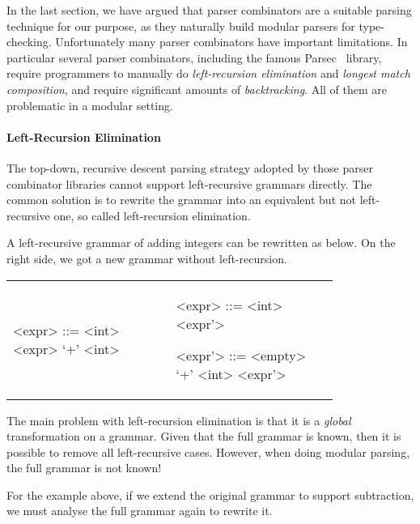 
In the last section, we have argued that parser combinators are a suitable parsing technique for
our purpose, as they naturally build modular parsers for type-checking.
Unfortunately many parser combinators have important limitations.
In particular several parser combinators,
including the famous Parsec~\cite{Leijen2001} library, require
programmers to manually do \textit{left-recursion elimination} and \textit{longest match composition}, and
require significant amounts of \textit{backtracking}. All of them are
problematic in a modular setting.



\paragraph{Left-Recursion Elimination} The top-down, recursive descent parsing strategy adopted by those parser combinator libraries cannot support left-recursive grammars directly. The common solution is to rewrite the grammar into an equivalent but not left-recursive one, so called left-recursion elimination.

A left-recursive grammar of adding integers can be rewritten as below. On the right side, we got a new grammar without left-recursion.

\begin{tabular}{m{0.4\linewidth}m{0.4\linewidth}}
\setlength{\grammarindent}{5em}
\begin{grammar}
<expr> ::= <int> \alt <expr> `+' <int>
\end{grammar}
&
\setlength{\grammarindent}{5em}
\begin{grammar}
<expr> ::= <int> <expr'>

<expr'> ::= <empty> \alt `+' <int> <expr'>
\end{grammar}
\end{tabular}

The main problem with left-recursion elimination is that it is a
\emph{global} transformation on a grammar. Given that the full grammar
is known, then it is possible to remove all left-recursive
cases. However, when doing modular parsing, the full grammar is not
known!

For the example above, if we extend the original grammar to support
subtraction, we must analyse the full grammar again to rewrite it.

